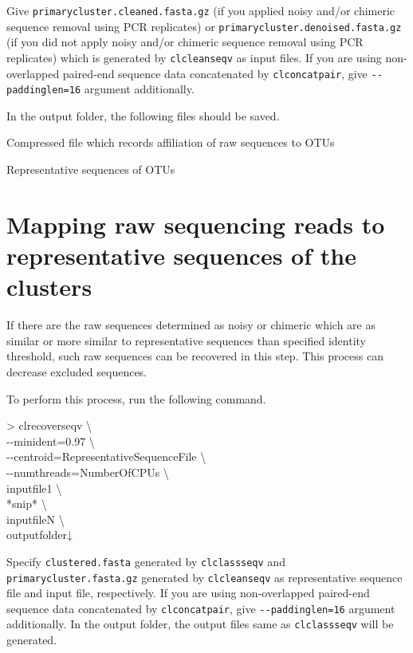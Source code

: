 \documentclass[titlepage,10pt,a4paper,english]{jsbook}
\newenvironment{cmd}{\begin{oframed}\raggedright\ttfamily\footnotesize\setlength{\baselineskip}{1.4em}}{\end{oframed}\vspace{-1em}}
\begin{document}
Give \texttt{primarycluster.cleaned.fasta.gz} (if you applied noisy and/or chimeric sequence removal using PCR replicates) or \texttt{primarycluster.denoised.fasta.gz} (if you did not apply noisy and/or chimeric sequence removal using PCR replicates) which is generated by \texttt{clcleanseqv} as input files.
If you are using non-overlapped paired-end sequence data concatenated by \texttt{clconcatpair}, give \texttt{{-}{-}paddinglen=16} argument additionally.

In the output folder, the following files should be saved.

\begin{description}\small\setlength{\baselineskip}{1.1em}
\item[clustered.otu.gz] Compressed file which records affiliation of raw sequences to OTUs
\item[clustered.fasta] Representative sequences of OTUs
\end{description}

\section{Mapping raw sequencing reads to representative sequences of the clusters}

If there are the raw sequences determined as noisy or chimeric which are as similar or more similar to representative sequences than specified identity threshold, such raw sequences can be recovered in this step.
This process can decrease excluded sequences.

To perform this process, run the following command.

\begin{cmd}
{\textgreater} clrecoverseqv {\textbackslash}\\
{-}{-}minident=0.97 {\textbackslash}\\
{-}{-}centroid=RepresentativeSequenceFile {\textbackslash}\\
{-}{-}numthreads=NumberOfCPUs {\textbackslash}\\
inputfile1 {\textbackslash}\\
*snip* {\textbackslash}\\
inputfileN {\textbackslash}\\
outputfolder↓
\end{cmd}

Specify \texttt{clustered.fasta} generated by \texttt{clclassseqv} and \texttt{primarycluster.fasta.gz} generated by \texttt{clcleanseqv} as representative sequence file and input file, respectively.
If you are using non-overlapped paired-end sequence data concatenated by \texttt{clconcatpair}, give \texttt{{-}{-}paddinglen=16} argument additionally.
In the output folder, the output files same as \texttt{clclassseqv} will be generated.
\end{document}
